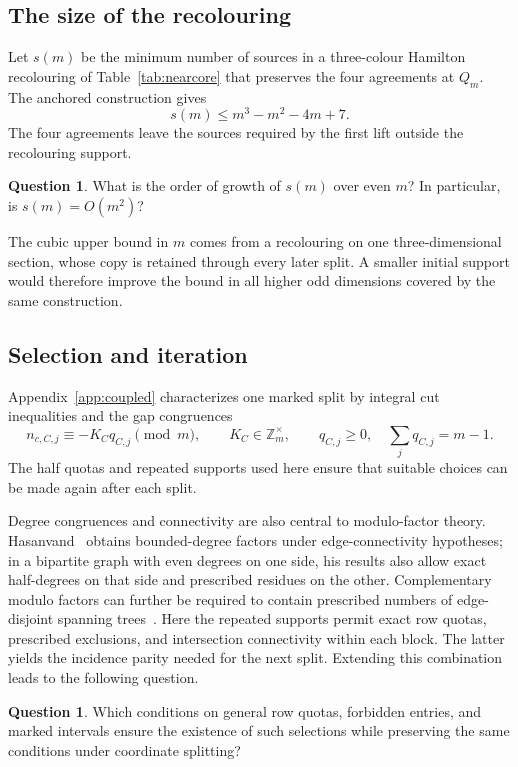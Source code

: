\documentclass[11pt,reqno]{amsart}
\numberwithin{equation}{section}
\theoremstyle{definition}
\newtheorem{question}[theorem]{Question}
\theoremstyle{remark}
\begin{document}
\subsection{The size of the recolouring}
Let $s(m)$ be the minimum number of sources in a three-colour Hamilton
recolouring of Table~\ref{tab:nearcore} that preserves the four agreements
at $Q_m$. The anchored construction gives
\[
 s(m)\le m^3-m^2-4m+7.
\]
The four agreements leave the sources required by the first lift
outside the recolouring support.

\begin{question}\label{ques:support}
What is the order of growth of $s(m)$ over even $m$? In particular, is
$s(m)=O(m^2)$?
\end{question}

The cubic upper bound in $m$ comes from a recolouring on one
three-dimensional section, whose copy is retained through every later
split. A smaller initial support would therefore improve the bound in
all higher odd dimensions covered by the same construction.

\subsection{Selection and iteration}
Appendix~\ref{app:coupled} characterizes one marked split by integral cut
inequalities and the gap congruences
\[
 n_{c,C,j}\equiv-K_Cq_{C,j}\pmod m,
 \qquad K_C\in\mathbb Z_m^\times,
 \qquad q_{C,j}\ge0,\quad\sum_jq_{C,j}=m-1.
\]
The half quotas and repeated supports used here ensure that suitable
choices can be made again after each split.

Degree congruences and connectivity are also central to modulo-factor
theory. Hasanvand~\cite{Hasanvand25} obtains bounded-degree factors under
edge-connectivity hypotheses; in a bipartite graph with even degrees on
one side, his results also allow exact half-degrees on that side and
prescribed residues on the other. Complementary modulo factors can
further be required to contain prescribed numbers of edge-disjoint
spanning trees~\cite{Hasanvand22TC}. Here the repeated supports permit
exact row quotas, prescribed exclusions, and intersection connectivity
within each block. The latter yields the incidence parity needed for
the next split. Extending this combination leads to the following
question.

\begin{question}\label{ques:quotas}\label{ques:iterative-selection}
Which conditions on general row quotas, forbidden entries, and marked
intervals ensure the existence of such selections while preserving the
same conditions under coordinate splitting?
\end{question}
\end{document}
